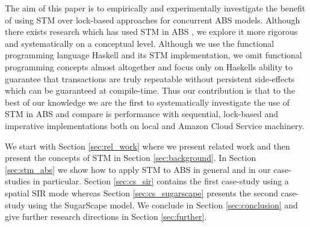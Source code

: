 The aim of this paper is to empirically and experimentally investigate the benefit of using STM over lock-based approaches for concurrent ABS models. Although there exists research which has used STM in ABS \cite{bezirgiannis_improving_2013}, we explore it more rigorous and systematically on a conceptual level. Although we use the functional programming language Haskell and its STM implementation, we omit functional programming concepts almost altogether and focus only on Haskells ability to guarantee that transactions are truly repeatable without persistent side-effects which can be guaranteed at compile-time. Thus our contribution is that to the best of our knowledge we are the first to systematically investigate the use of STM in ABS and compare is performance with sequential, lock-based and imperative implementations both on local and Amazon Cloud Service machinery.

We start with Section \ref{sec:rel_work} where we present related work and then present the concepts of STM in Section \ref{sec:background}. In Section \ref{sec:stm_abs} we show how to apply STM to ABS in general and in our case-studies in particular. Section \ref{sec:cs_sir} contains the first case-study using a spatial SIR mode whereas Section \ref{sec:cs_sugarscape} presents the second case-study using the SugarScape model. We conclude in Section \ref{sec:conclusion} and give further research directions in Section \ref{sec:further}.
